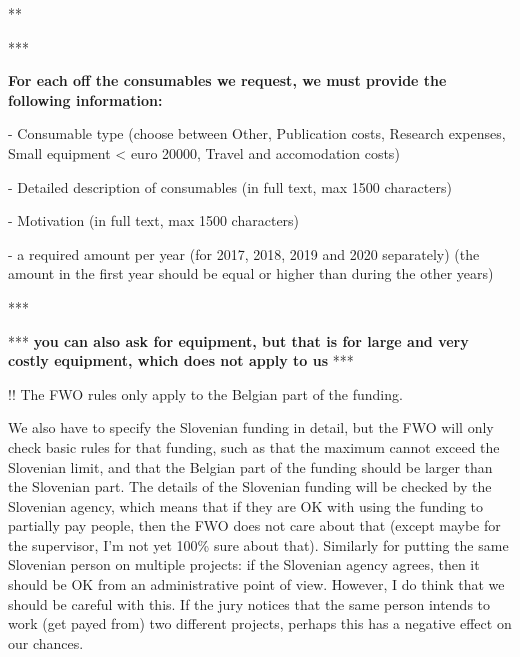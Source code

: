 \documentclass[11pt,dvipsnames,usenames,a4paper]{article}
\begin{document}
** 

*** {\bf\color{blue}For each off the consumables we request, we must provide the following information:

- Consumable type (choose between Other, Publication costs, Research expenses, Small equipment < euro 20000, Travel and accomodation costs)

- Detailed description of consumables (in full text, max 1500 characters)

- Motivation (in full text, max 1500 characters)

- a required amount per year (for 2017, 2018, 2019 and 2020 separately) (the amount in the first year should be equal or higher than during the other years)

} ***

*** {\bf\color{blue} you can also ask for equipment, but that is for large and very costly equipment, which does not apply to us} ***

!! The FWO rules only apply to the Belgian part of the funding.

We also have to specify the Slovenian funding in detail, but the FWO will only check basic rules for that funding, such as that the maximum cannot exceed the Slovenian limit, and that the Belgian part of the funding should be larger than the Slovenian part. The details of the Slovenian funding will be checked by the Slovenian agency, which means that if they are OK with using the funding to partially pay people, then the FWO does not care about that (except maybe for the supervisor, I'm not yet 100\% sure about that). Similarly for putting the same Slovenian person on multiple projects: if the Slovenian agency agrees, then it should be OK from an administrative point of view. However, I do think that we should be careful with this. If the jury notices that the same person intends to work (get payed from) two different projects, perhaps this has a negative effect on our chances.
\end{document}

